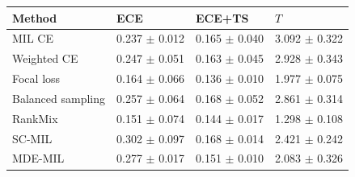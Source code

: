 \begin{tabular}{llll}
\toprule
Method & ECE & ECE+TS & $T$\\
\midrule
MIL CE & \num{0.237} $\pm$ \num{0.012} & \num{0.165} $\pm$ \num{0.040} & \num{3.092} $\pm$ \num{0.322}\\
Weighted CE & \num{0.247} $\pm$ \num{0.051} & \num{0.163} $\pm$ \num{0.045} & \num{2.928} $\pm$ \num{0.343}\\
Focal loss & \num{0.164} $\pm$ \num{0.066} & \num{0.136} $\pm$ \num{0.010} & \num{1.977} $\pm$ \num{0.075}\\
Balanced sampling & \num{0.257} $\pm$ \num{0.064} & \num{0.168} $\pm$ \num{0.052} & \num{2.861} $\pm$ \num{0.314}\\
RankMix & \num{0.151} $\pm$ \num{0.074} & \num{0.144} $\pm$ \num{0.017} & \num{1.298} $\pm$ \num{0.108}\\
SC-MIL & \num{0.302} $\pm$ \num{0.097} & \num{0.168} $\pm$ \num{0.014} & \num{2.421} $\pm$ \num{0.242}\\
MDE-MIL & \num{0.277} $\pm$ \num{0.017} & \num{0.151} $\pm$ \num{0.010} & \num{2.083} $\pm$ \num{0.326}\\
\bottomrule
\end{tabular}

